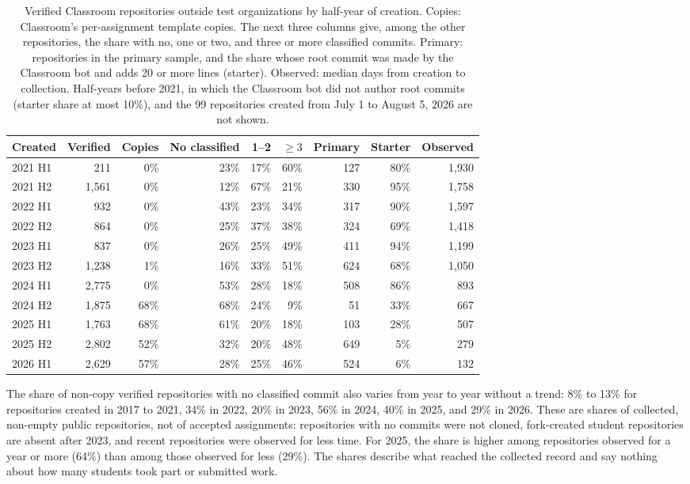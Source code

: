 \documentclass[acmsmall,screen,review,anonymous]{acmart}
\begin{document}
\begin{table}
\caption{Verified Classroom repositories outside test organizations by half-year of creation. Copies: Classroom's per-assignment template copies. The next three columns give, among the other repositories, the share with no, one or two, and three or more classified commits. Primary: repositories in the primary sample, and the share whose root commit was made by the Classroom bot and adds 20 or more lines (starter). Observed: median days from creation to collection. Half-years before 2021, in which the Classroom bot did not author root commits (starter share at most 10\%), and the 99 repositories created from July 1 to August 5, 2026 are not shown.}
\label{tab:recordgen}
\footnotesize
\setlength{\tabcolsep}{4pt}
\begin{tabular}{@{}l r r r r r r r r@{}}
\toprule
Created & Verified & Copies & No classified & 1--2 & $\geq 3$ & Primary & Starter & Observed \\
\midrule
2021 H1 & 211 & 0\% & 23\% & 17\% & 60\% & 127 & 80\% & 1,930 \\
2021 H2 & 1,561 & 0\% & 12\% & 67\% & 21\% & 330 & 95\% & 1,758 \\
2022 H1 & 932 & 0\% & 43\% & 23\% & 34\% & 317 & 90\% & 1,597 \\
2022 H2 & 864 & 0\% & 25\% & 37\% & 38\% & 324 & 69\% & 1,418 \\
2023 H1 & 837 & 0\% & 26\% & 25\% & 49\% & 411 & 94\% & 1,199 \\
2023 H2 & 1,238 & 1\% & 16\% & 33\% & 51\% & 624 & 68\% & 1,050 \\
2024 H1 & 2,775 & 0\% & 53\% & 28\% & 18\% & 508 & 86\% & 893 \\
2024 H2 & 1,875 & 68\% & 68\% & 24\% & 9\% & 51 & 33\% & 667 \\
2025 H1 & 1,763 & 68\% & 61\% & 20\% & 18\% & 103 & 28\% & 507 \\
2025 H2 & 2,802 & 52\% & 32\% & 20\% & 48\% & 649 & 5\% & 279 \\
2026 H1 & 2,629 & 57\% & 28\% & 25\% & 46\% & 524 & 6\% & 132 \\
\bottomrule
\end{tabular}
\end{table}

The share of non-copy verified repositories with no classified commit also varies from year to year without a trend: 8\% to 13\% for repositories created in 2017 to 2021, 34\% in 2022, 20\% in 2023, 56\% in 2024, 40\% in 2025, and 29\% in 2026. These are shares of collected, non-empty public repositories, not of accepted assignments: repositories with no commits were not cloned, fork-created student repositories are absent after 2023, and recent repositories were observed for less time. For 2025, the share is higher among repositories observed for a year or more (64\%) than among those observed for less (29\%). The shares describe what reached the collected record and say nothing about how many students took part or submitted work.
\end{document}
